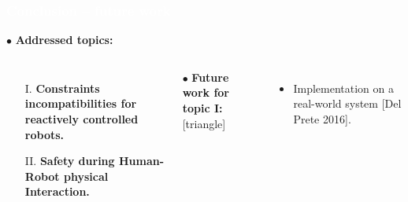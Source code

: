 \begin{frame}[noframenumbering]
\frametitle{{\textcolor{white}{\hspace{0.3cm}Conclusion -- future work}}}
\hspace{-6mm}
$\bullet$ {\color{blue-violet}\textbf{Addressed topics:}}
\begin{columns}
\column{\paperwidth-10mm}
\begin{itemize}
\item[I.]  {\color{red}\textbf{Constraints incompatibilities for reactively controlled robots.}}
\item[II.] {\color{red}\textbf{Safety during Human-Robot physical Interaction.}}
\end{itemize}
\vspace{5mm}
$\bullet$ {\color{ao(english)}\textbf{Future work for topic I:}}
[triangle] 
\begin{itemize}
\item Implementation on a real-world system [Del Prete 2016].
\end{itemize}

\end{columns}
\end{frame}










